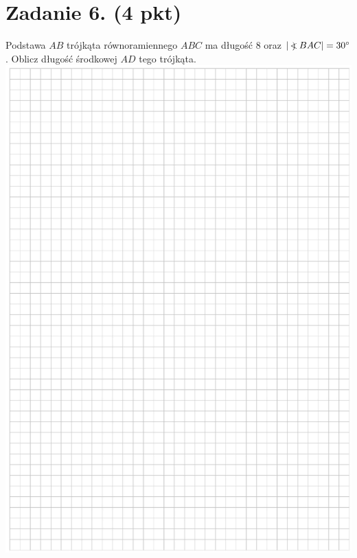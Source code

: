 \documentclass[10pt]{article}
\newcommand\Varangle{\mathop{{<\!\!\!\!\!\text{\small)}}\:}\nolimits}
\begin{document}
\section*{Zadanie 6. (4 pkt)}
Podstawa \(A B\) trójkąta równoramiennego \(A B C\) ma długość 8 oraz \(|\Varangle B A C|=30^{\circ}\). Oblicz długość środkowej \(A D\) tego trójkąta.\\
\includegraphics[max width=\textwidth, center]{2024_11_21_b36d8cbb94edb763da2cg-08}\\
\end{document}
